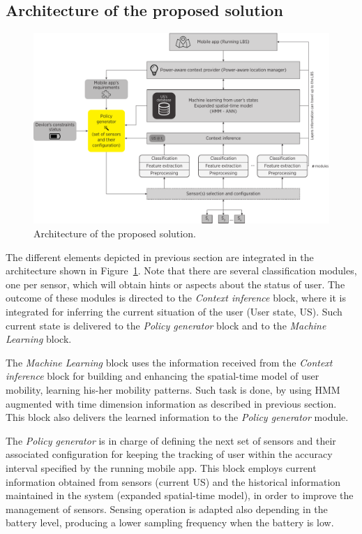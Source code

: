 \documentclass[ENG,PhD]{cinvestav}
\begin{document}
\subsection{Architecture of the proposed solution}
\begin{figure}[t]
  \centering
  \includegraphics[width=\textwidth]{solution-general-overview}
  \caption{Architecture of the proposed solution.}
  \label{fig:solution-architecture}
\end{figure}

The different elements depicted in previous section are integrated in the architecture shown in Figure~\ref{fig:solution-architecture}.
Note that there are several classification modules, one per sensor, which will obtain hints or aspects about the status of user.
The outcome of these modules is directed to the \emph{Context inference} block, where it is integrated for inferring the current situation of the user (User state, US).
Such current state is delivered to the \emph{Policy generator} block and to the \emph{Machine Learning} block.

The \emph{Machine Learning} block uses the information received from the \emph{Context inference} block for building and enhancing the spatial-time model of user mobility, learning his-her mobility patterns.
Such task is done, by using HMM augmented with time dimension information as described in previous section.
This block also delivers the learned information to the \emph{Policy generator} module.

The \emph{Policy generator} is in charge of defining the next set of sensors and their associated configuration for keeping the tracking of user within the accuracy interval specified by the running mobile app.
This block employs current information obtained from sensors (current US) and the historical information maintained in the system (expanded spatial-time model), in order to improve the management of sensors.
Sensing operation is adapted also depending in the battery level, producing a lower sampling frequency when the battery is low.
\end{document}
